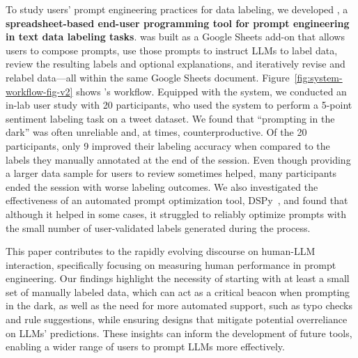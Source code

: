 To study users' prompt engineering practices for data labeling, we developed \textbf{\system}, 
a \textbf{spreadsheet-based end-user programming tool for prompt engineering in text data labeling tasks}.
\system was built as a Google Sheets add-on that allows users to compose prompts, use those prompts to instruct LLMs to label data, review the resulting labels and optional explanations, and iteratively revise and relabel data---all within the same Google Sheets document.
Figure~\ref{fig:system-workflow-fig-v2} shows \system's workflow.
Equipped with the system, we conducted an in-lab user study with 20 participants, who used the system to perform a 5-point sentiment labeling task on a tweet dataset.
We found that ``prompting in the dark'' was often unreliable and, at times, counterproductive. 
Of the 20 participants, only 9 improved their labeling accuracy when compared to the labels they manually annotated at the end of the session.
Even though providing %
a larger data sample for users to review sometimes helped, many participants ended the session with worse labeling outcomes.
We also investigated the effectiveness of an automated prompt optimization tool, DSPy~\cite{khattab2023dspy}, and found that although it helped in some cases, it struggled to reliably optimize prompts with the small number of user-validated labels generated during the process.

This paper contributes to the rapidly evolving discourse on human-LLM interaction, specifically focusing on measuring human performance in prompt engineering. 
Our findings highlight the necessity of starting with at least a small set of manually labeled data, which can act as a critical beacon when prompting in the dark, as well as the need for more automated support, such as typo checks and rule suggestions,
while ensuring designs that mitigate potential overreliance on LLMs' predictions. 
These insights can inform the development of future tools, enabling a wider range of users to prompt LLMs more effectively.

